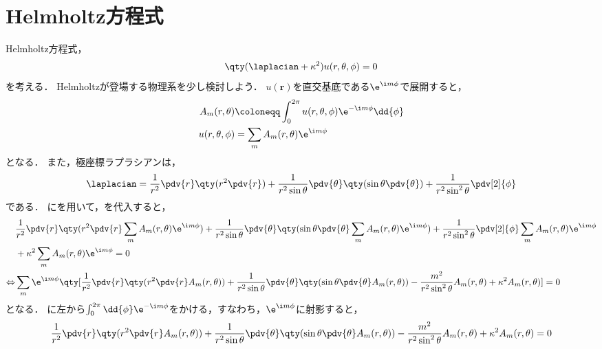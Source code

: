 \documentclass{report}
\begin{document}
    \section{Helmholtz方程式}
      Helmholtz方程式，
      \begin{align}
        \qty(\laplacian + \kappa^2)u(r, \theta, \phi) = 0\label{helmholtz-eq-wave}
      \end{align}
      を考える．
      Helmholtzが登場する物理系を少し検討しよう．
      $u(\bm{r})$を直交基底である$\e^{\i m\phi}$で展開すると，
      \begin{align}
        A_m(r, \theta) &\coloneqq \int_{0}^{2\pi}u(r, \theta, \phi)\e^{-\i m\phi}\dd{\phi} \\ 
        u(r, \theta, \phi) &= \sum_{m}A_m(r, \theta)\e^{\i m\phi}\label{u-expand-with-a} \\ 
      \end{align}
      となる．
      また，極座標ラプラシアンは，
      \begin{align}
        \laplacian = \frac{1}{r^2}\pdv{r}\qty(r^2\pdv{r}) + \frac{1}{r^2\sin\theta}\pdv{\theta}\qty(\sin\theta\pdv{\theta}) + \frac{1}{r^2\sin^2\theta}\pdv[2]{\phi} \label{polar-laplacian}
      \end{align}
      である．
      にを用いて，を代入すると，
      \begin{align}
        &\frac{1}{r^2}\pdv{r}\qty(r^2\pdv{r}\sum_{m}A_m(r, \theta)\e^{\i m\phi}) + \frac{1}{r^2\sin\theta}\pdv{\theta}\qty(\sin\theta\pdv{\theta}\sum_{m}A_m(r, \theta)\e^{\i m\phi}) + \frac{1}{r^2\sin^2\theta}\pdv[2]{\phi}\sum_{m}A_m(r, \theta)\e^{\i m\phi} \notag \\ 
        &+ \kappa^2\sum_{m}A_m(r, \theta)\e^{\i m\phi} = 0 \\ 
        \Leftrightarrow &\sum_{m}\e^{\i m\phi}\qty[
          \frac{1}{r^2}\pdv{r}\qty(r^2\pdv{r}A_m(r, \theta)) + 
          \frac{1}{r^2\sin\theta}\pdv{\theta}\qty(\sin\theta\pdv{\theta}A_m(r, \theta)) 
          - \frac{m^2}{r^2\sin^2\theta}A_m(r, \theta) + \kappa^2A_m(r, \theta)
        ] = 0 \label{am-before-int}
      \end{align}
      となる．
      に左から$\int_{0}^{2\pi}\dd{\phi}\e^{-\i m\phi}$をかける，すなわち，$\e^{\i m\phi}$に射影すると，
      \begin{align}
        \frac{1}{r^2}\pdv{r}\qty(r^2\pdv{r}A_m(r, \theta)) + \frac{1}{r^2\sin\theta}\pdv{\theta}\qty(\sin\theta\pdv{\theta}A_m(r, \theta)) - \frac{m^2}{r^2\sin^2\theta}A_m(r, \theta) + \kappa^2A_m(r, \theta) = 0 \label{a-condition}
      \end{align}
\end{document}
